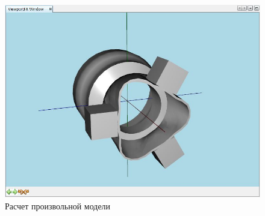 \documentclass[14pt,oneside,final]{extreport}
\begin{document}
\begin{appendices}
	\begin{figure}[t!]
		\begin{center}
			\includegraphics[scale=0.8]{img/arbitrary-model-test} 
		\end{center}
		\caption{Расчет произвольной модели}
		\label{fig:arbitrary-mode}
	\end{figure}

	\end{appendices}
	
	\setcounter{figure}{\figcount}		
	\setcounter{table}{\tabcount}
\end{document}
